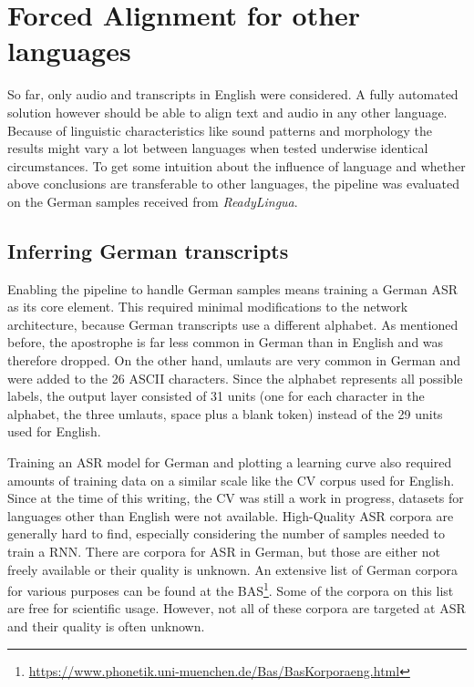 \section{Forced Alignment for other languages}

So far, only audio and transcripts in English were considered. A fully automated solution however should be able to align text and audio in any other language. Because of linguistic characteristics like sound patterns and morphology the results might vary a lot between languages when tested underwise identical circumstances. To get some intuition about the influence of language and whether above conclusions are transferable to other languages, the pipeline was evaluated on the German samples received from \textit{ReadyLingua}.

\subsection{Inferring German transcripts}

Enabling the pipeline to handle German samples means training a German \ac{ASR} as its core element. This required minimal modifications to the network architecture, because German transcripts use a different alphabet. As mentioned before, the apostrophe is far less common in German than in English and was therefore dropped. On the other hand, umlauts are very common in German and were added to the 26 ASCII characters. Since the alphabet represents all possible labels, the output layer consisted of 31 units (one for each character in the alphabet, the three umlauts, space plus a blank token) instead of the 29 units used for English.

Training an \ac{ASR} model for German and plotting a learning curve also required amounts of training data on a similar scale like the \ac{CV} corpus used for English. Since at the time of this writing, the \ac{CV} was still a work in progress, datasets for languages other than English were not available. High-Quality \ac{ASR} corpora are generally hard to find, especially considering the number of samples needed to train a \ac{RNN}. There are corpora for \ac{ASR} in German, but those are either not freely available or their quality is unknown. An extensive list of German corpora for various purposes can be found at the \ac{BAS}\footnote{\url{https://www.phonetik.uni-muenchen.de/Bas/BasKorporaeng.html}}. Some of the corpora on this list are free for scientific usage. However, not all of these corpora are targeted at \ac{ASR} and their quality is often unknown.

